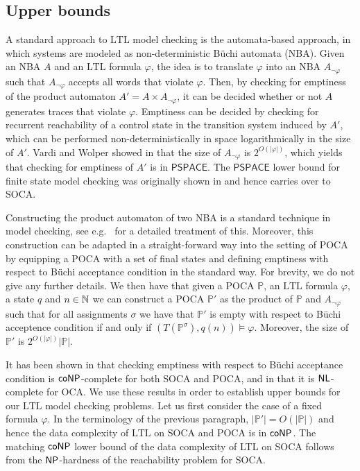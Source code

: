 \documentclass[times,envcountsame]{llncs}
\def\PSPACE{{\mathsf{PSPACE}}}
\newcommand{\automaton}{\ensuremath{A}}
\newcommand{\Poca}{\mathbb{P}}
\newcommand{\Soca}{\mathbb{S}}
\newcommand{\ltl}{\text{LTL}}
\begin{document}
\subsection{Upper bounds}

A standard approach to $\ltl$ model checking is the automata-based
approach, in which systems are modeled as non-deterministic B\"uchi
automata (NBA). Given an NBA $\automaton$ and an $\ltl$ formula
$\varphi$, the idea is to translate $\varphi$ into an NBA
$\automaton_{\neg \varphi}$ such that $\automaton_{\neg \varphi}$
accepts all words that violate $\varphi$.  Then, by checking for
emptiness of the product automaton
$\automaton'=\automaton\times\automaton_{\neg \varphi}$, it can be
decided whether or not $\automaton$ generates traces that violate
$\varphi$.  Emptiness can be decided by checking for recurrent
reachability of a control state in the transition system induced by
$\automaton'$, which can be performed non-deterministically in space logarithmically in the size of
$\automaton'$. Vardi and Wolper showed in \cite{VW86} that the size of
$\automaton_{\neg \varphi}$ is $2^{O(|\varphi|)}$, which yields that
checking for emptiness of $\automaton'$ is in $\PSPACE$. The $\PSPACE$
lower bound for finite state model checking was originally shown
in \cite{LP85-popl} and hence carries over to SOCA.

Constructing the product automaton of two NBA is a standard technique
in model checking, see e.g.\ \cite{BK08} for a detailed treatment of
this. Moreover, this construction can be adapted in a
straight-forward way into the setting of POCA by equipping a POCA with
a set of final states and defining emptiness with respect to B\"uchi
acceptance condition in the standard way. For brevity, we do not give
any further details. We then have that given a POCA $\Poca$, an $\ltl$
formula $\varphi$, a state $q$ and $n\in\mathbb{N}$ we can construct a
POCA $\Poca'$ as the product of $\Poca$ and $\automaton_{\neg\varphi}$
such that for all assignments $\sigma$ we have that $\Poca'$ is empty
with respect to B\"uchi acceptence condition if and only if
$(T(\Poca^\sigma),q(n))\models \varphi$. Moreover, the size of
$\Poca'$ is $2^{O(|\varphi|)}|\Poca|$.

It has been shown in \cite{HKOW10} that checking emptiness with
respect to B\"uchi acceptance condition is ${\mathsf{coNP}}$-complete for both
SOCA and POCA, and in \cite{DG-jlc09} that it is ${\mathsf{NL}}$-complete for
OCA. We use these results in order to establish upper bounds for our
$\ltl$ model checking problems. Let us first consider the case of a
fixed formula $\varphi$. In the terminology of the previous paragraph,
$|\Poca'|=O(|\Poca|)$ and hence the data complexity of $\ltl$ on SOCA
and POCA is in ${\mathsf{coNP}}$.  The matching ${\mathsf{coNP}}$ lower bound of the data
complexity of LTL on SOCA follows from the ${\mathsf{NP}}$-hardness of the
reachability problem for SOCA.
\end{document}
